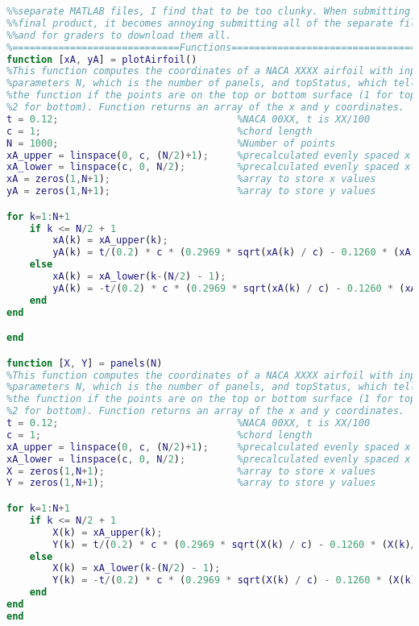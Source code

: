 \documentclass[12pt]{article}
\begin{document}
\begin{lstlisting}[language=Matlab]
%%NOTE: Also, although I am aware that it says to declare functions in
%%separate MATLAB files, I find that to be too clunky. When submitting the
%%final product, it becomes annoying submitting all of the separate files
%%and for graders to download them all.
%=============================Functions====================================
function [xA, yA] = plotAirfoil()
%This function computes the coordinates of a NACA XXXX airfoil with input
%parameters N, which is the number of panels, and topStatus, which tells
%the function if the points are on the top or bottom surface (1 for top and
%2 for bottom). Function returns an array of the x and y coordinates.
t = 0.12;                               %NACA 00XX, t is XX/100
c = 1;                                  %chord length
N = 1000;                               %Number of points
xA_upper = linspace(0, c, (N/2)+1);     %precalculated evenly spaced x values from [0, c]
xA_lower = linspace(c, 0, N/2);         %precalculated evenly spaced x values from [c, 0]
xA = zeros(1,N+1);                      %array to store x values
yA = zeros(1,N+1);                      %array to store y values

for k=1:N+1
    if k <= N/2 + 1
        xA(k) = xA_upper(k);
        yA(k) = t/(0.2) * c * (0.2969 * sqrt(xA(k) / c) - 0.1260 * (xA(k)/c) - 0.3516 * (xA(k)/c)^2 + 0.2843 * (xA(k)/c)^3 - 0.1015 * (xA(k)/c)^4);
    else
        xA(k) = xA_lower(k-(N/2) - 1);
        yA(k) = -t/(0.2) * c * (0.2969 * sqrt(xA(k) / c) - 0.1260 * (xA(k)/c) - 0.3516 * (xA(k)/c)^2 + 0.2843 * (xA(k)/c)^3 - 0.1015 * (xA(k)/c)^4);
    end
end

end

function [X, Y] = panels(N)
%This function computes the coordinates of a NACA XXXX airfoil with input
%parameters N, which is the number of panels, and topStatus, which tells
%the function if the points are on the top or bottom surface (1 for top and
%2 for bottom). Function returns an array of the x and y coordinates.
t = 0.12;                               %NACA 00XX, t is XX/100
c = 1;                                  %chord length
xA_upper = linspace(0, c, (N/2)+1);     %precalculated evenly spaced x values from [0, c]
xA_lower = linspace(c, 0, N/2);         %precalculated evenly spaced x values from [c, 0]
X = zeros(1,N+1);                       %array to store x values
Y = zeros(1,N+1);                       %array to store y values

for k=1:N+1
    if k <= N/2 + 1
        X(k) = xA_upper(k);
        Y(k) = t/(0.2) * c * (0.2969 * sqrt(X(k) / c) - 0.1260 * (X(k)/c) - 0.3516 * (X(k)/c)^2 + 0.2843 * (X(k)/c)^3 - 0.1015 * (X(k)/c)^4);
    else
        X(k) = xA_lower(k-(N/2) - 1);
        Y(k) = -t/(0.2) * c * (0.2969 * sqrt(X(k) / c) - 0.1260 * (X(k)/c) - 0.3516 * (X(k)/c)^2 + 0.2843 * (X(k)/c)^3 - 0.1015 * (X(k)/c)^4);
    end
end
end


\end{lstlisting}
\end{document}
